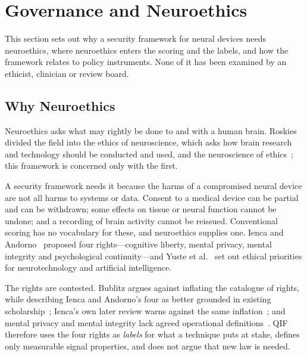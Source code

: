 
\section{Governance and Neuroethics}
\label{sec:governance}

This section sets out why a security framework for neural devices needs neuroethics, where
neuroethics enters the scoring and the labels, and how the framework relates to policy
instruments. None of it has been examined by an ethicist, clinician or review board.

\subsection{Why Neuroethics}
\label{sec:why-neuroethics}

Neuroethics asks what may rightly be done to and with a human brain. Roskies divided the
field into the ethics of neuroscience, which asks how brain research and technology should
be conducted and used, and the neuroscience of ethics~\cite{roskies2002neuroethics}; this
framework is concerned only with the first.

A security framework needs it because the harms of a compromised neural device are not all
harms to systems or data. Consent to a medical device can be partial and can be withdrawn;
some effects on tissue or neural function cannot be undone; and a recording of brain
activity cannot be reissued. Conventional scoring has no vocabulary for these, and
neuroethics supplies one. Ienca and Andorno~\cite{ienca2017neurorights} proposed four
rights---cognitive liberty, mental privacy, mental integrity and psychological
continuity---and Yuste et al.~\cite{yuste2017four} set out ethical priorities for
neurotechnology and artificial intelligence.

The rights are contested. Bublitz argues against inflating the catalogue of rights, while
describing Ienca and Andorno's four as better grounded in existing
scholarship~\cite{bublitz2022freedom}; Ienca's own later review warns against the same
inflation~\cite{ienca2021neurorights}; and mental privacy and mental integrity lack agreed
operational definitions~\cite{kellmeyer2022neurorights}. QIF therefore uses the four rights
as \emph{labels} for what a technique puts at stake, defines only measurable signal
properties, and does not argue that new law is needed.


